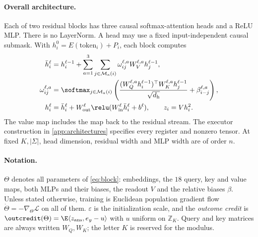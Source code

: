 \paragraph{Overall architecture.}\label{ass:arch}
Each of two residual blocks has three causal softmax-attention heads and a ReLU MLP. There is no LayerNorm. A head may use a fixed input-independent causal submask. With $h_i^0=E(\mathrm{token}_i)+P_i$, each block computes
\begin{align}
\bar h_i^\ell&=h_i^{\ell-1}+\sum_{a=1}^3\sum_{j\in\mathcal M_a(i)}\omega_{ij}^{\ell,a} W_V^{\ell,a}h_j^{\ell-1},\nonumber\\
\omega_{ij}^{\ell,a}&=\softmax_{j\in\mathcal M_a(i)}\left(\frac{(W_Q^{\ell,a}h_i^{\ell-1})^\top W_K^{\ell,a}h_j^{\ell-1}}{\sqrt{d_{\mathrm h}}}+\beta_{i-j}^{\ell,a}\right),\label{eq:block}\\
h_i^\ell&=\bar h_i^\ell+W_{\mathrm{out}}^\ell\relu(W_{\mathrm{in}}^\ell\bar h_i^\ell+b^\ell),\qquad z_i=Vh_i^2.\nonumber
\end{align}
The value map includes the map back to the residual stream. The executor construction in \cref{app:architectures} specifies every register and nonzero tensor. At fixed $K,|\Sigma|$, head dimension, residual width and MLP width are of order $n$.

\paragraph{Notation.} $\Theta$ denotes all parameters of \cref{eq:block}: embeddings, the $18$ query, key and value maps, both MLPs and their biases, the readout $V$ and the relative biases $\beta$. Unless stated otherwise, training is Euclidean population gradient flow $\dot\Theta=-\nabla_\Theta\mathcal L$ on all of them. $\varepsilon$ is the initialization scale, and the \emph{outcome credit} is $\outcredit(\Theta)=\E\langle z_{\mathrm{ans}},e_y-u\rangle$ with $u$ uniform on $\mathbb Z_K$. Query and key matrices are always written $W_Q,W_K$; the letter $K$ is reserved for the modulus.

